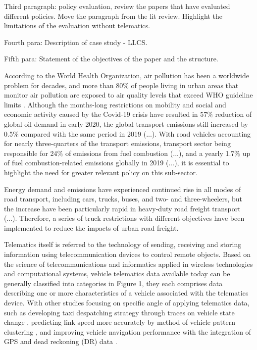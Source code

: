 \documentclass[preprint,12pt,3p]{elsarticle}
\begin{document}
Third paragraph: policy evaluation, review the papers that have evaluated different policies. Move the paragraph from the lit review. Highlight the limitations of the evaluation without telematics.

Fourth para: Description of case study - LLCS.

Fifth para: Statement of the objectives of the paper and the structure.



According to the World Health Organization, air pollution has been a worldwide problem for decades, and more than 80$\%$ of people living in urban areas that monitor air pollution are exposed to air quality levels that exceed WHO guideline limits \cite{RN161}. Although the months-long restrictions on mobility and social and economic activity caused by the Covid-19 crisis have resulted in 57$\%$ reduction of global oil demand in early 2020, the global transport emissions still increased by 0.5$\%$ compared with the same period in 2019 (...). With road vehicles accounting for nearly three-quarters of the transport emissions, transport sector being responsible for 24$\%$ of emissions from fuel combustion (...), and a yearly 1.7$\%$ up of fuel combustion-related emissions globally in 2019 (...), it is essential to highlight the need for greater relevant policy on this sub-sector.


Energy demand and emissions have experienced continued rise in all modes of road transport, including cars, trucks, buses, and two- and three-wheelers, but the increase have been particularly rapid in heavy-duty road freight transport (...). Therefore, a series of truck restrictions with different objectives have been implemented to reduce the impacts of urban road freight.



Telematics itself is referred to the technology of sending, receiving and storing information using telecommunication devices to control remote objects. Based on the science of telecommunications and informatics applied in wireless technologies and computational systems, vehicle telematics data available today can be generally classified into categories in Figure 1, they each comprises data describing one or more characteristics of a vehicle associated with the telematics device. With other studies focusing on specific angle of applying telematics data, such as developing taxi despatching strategy through traces on vehicle state change \cite{RN158}, predicting link speed more accurately by method of vehicle pattern clustering \cite{RN162,RN163}, and improving vehicle navigation performance with the integration of GPS and dead reckoning (DR) data \cite{RN88,RN159}. 
\end{document}
